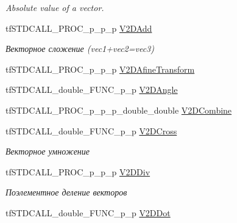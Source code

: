 \begin{DoxyCompactItemize}
\begin{DoxyCompactList}\small\item\em Absolute value of a vector. \end{DoxyCompactList}\item 
\hypertarget{structs_functions_vector_c_p_u_acdf15f4be048d06f04d9842c56476284}{tf\-S\-T\-D\-C\-A\-L\-L\-\_\-\-P\-R\-O\-C\-\_\-p\-\_\-p\-\_\-p \hyperlink{structs_functions_vector_c_p_u_acdf15f4be048d06f04d9842c56476284}{V2\-D\-Add}}\label{structs_functions_vector_c_p_u_acdf15f4be048d06f04d9842c56476284}

\begin{DoxyCompactList}\small\item\em Векторное сложение (vec1+vec2=vec3) \end{DoxyCompactList}\item 
tf\-S\-T\-D\-C\-A\-L\-L\-\_\-\-P\-R\-O\-C\-\_\-p\-\_\-p\-\_\-p \hyperlink{structs_functions_vector_c_p_u_a341a6dbf5be4b82895ce20b60070cc83}{V2\-D\-Afine\-Transform}
\item 
tf\-S\-T\-D\-C\-A\-L\-L\-\_\-double\-\_\-\-F\-U\-N\-C\-\_\-p\-\_\-p \hyperlink{structs_functions_vector_c_p_u_a7e131d347b02b1a68d027b992ce8ffa4}{V2\-D\-Angle}
\item 
tf\-S\-T\-D\-C\-A\-L\-L\-\_\-\-P\-R\-O\-C\-\_\-p\-\_\-p\-\_\-p\-\_\-double\-\_\-double \hyperlink{structs_functions_vector_c_p_u_a75b6fbe4f2cd1135ed91356026c8d051}{V2\-D\-Combine}
\item 
\hypertarget{structs_functions_vector_c_p_u_a6f604fd01707caf326154e47e2e7e687}{tf\-S\-T\-D\-C\-A\-L\-L\-\_\-double\-\_\-\-F\-U\-N\-C\-\_\-p\-\_\-p \hyperlink{structs_functions_vector_c_p_u_a6f604fd01707caf326154e47e2e7e687}{V2\-D\-Cross}}\label{structs_functions_vector_c_p_u_a6f604fd01707caf326154e47e2e7e687}

\begin{DoxyCompactList}\small\item\em Векторное умножение \end{DoxyCompactList}\item 
\hypertarget{structs_functions_vector_c_p_u_a06671afac4d45552771757f4d35de131}{tf\-S\-T\-D\-C\-A\-L\-L\-\_\-\-P\-R\-O\-C\-\_\-p\-\_\-p\-\_\-p \hyperlink{structs_functions_vector_c_p_u_a06671afac4d45552771757f4d35de131}{V2\-D\-Div}}\label{structs_functions_vector_c_p_u_a06671afac4d45552771757f4d35de131}

\begin{DoxyCompactList}\small\item\em Поэлементное деление векторов \end{DoxyCompactList}\item 
\hypertarget{structs_functions_vector_c_p_u_ab905e3270c3d9631da1e3476088be89a}{tf\-S\-T\-D\-C\-A\-L\-L\-\_\-double\-\_\-\-F\-U\-N\-C\-\_\-p\-\_\-p \hyperlink{structs_functions_vector_c_p_u_ab905e3270c3d9631da1e3476088be89a}{V2\-D\-Dot}}\label{structs_functions_vector_c_p_u_ab905e3270c3d9631da1e3476088be89a}


\end{DoxyCompactItemize}
